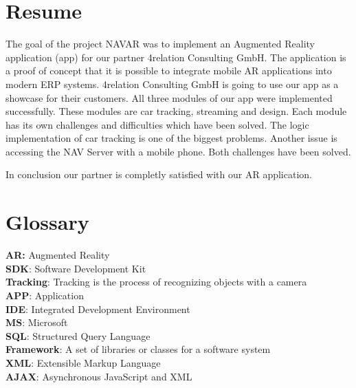 \chapter{Resume}\label{chapter:Resume}
The goal of the project NAVAR was to implement an Augmented Reality application (app) for our partner 4relation Consulting GmbH. The application is a proof of concept that it is possible to integrate mobile AR applications into modern ERP systems. 4relation Consulting GmbH is going to use our app as a showcase for their customers.
\newline
All three modules of our app were implemented successfully. These modules are car tracking, streaming and design. Each module has its own challenges and difficulties which have been solved. The logic implementation of car tracking is one of the biggest problems. Another issue is accessing the NAV Server with a mobile phone. Both challenges have been solved.

In conclusion our partner is completly satisfied with our AR application. 


 
\clearpage

\chapter{Glossary}
\textbf{AR:} Augmented Reality
\\

\textbf{SDK}: Software Development Kit 
\\

\textbf{Tracking}: Tracking is the process of recognizing objects with a camera
\\

\textbf{APP}: Application 
\\

\textbf{IDE}: Integrated Development Environment 
\\

\textbf{MS}: Microsoft
\\

\textbf{SQL}: Structured Query Language
\\

\textbf{Framework}: A set of libraries or classes for a software system 
\\

\textbf{XML}: Extensible Markup Language
\\

\textbf{AJAX}:  Asynchronous JavaScript and XML
\\